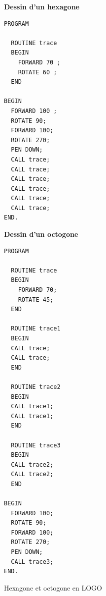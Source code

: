 \begin{table}[t]
  \centering
  \small


\begin{multicols}{2}

\textbf{Dessin d'un hexagone}

\begin{lstlisting}
PROGRAM

  ROUTINE trace
  BEGIN
    FORWARD 70 ;
    ROTATE 60 ;
  END

BEGIN
  FORWARD 100 ;
  ROTATE 90;
  FORWARD 100;
  ROTATE 270;
  PEN DOWN;
  CALL trace;
  CALL trace;
  CALL trace;
  CALL trace;
  CALL trace;
  CALL trace;
END.
\end{lstlisting}


\columnbreak

\textbf{Dessin d'un octogone}

\begin{lstlisting}
PROGRAM

  ROUTINE trace
  BEGIN
    FORWARD 70;
    ROTATE 45;
  END

  ROUTINE trace1
  BEGIN
  CALL trace;
  CALL trace;
  END

  ROUTINE trace2
  BEGIN
  CALL trace1;
  CALL trace1;
  END

  ROUTINE trace3
  BEGIN
  CALL trace2;
  CALL trace2;
  END

BEGIN
  FORWARD 100;
  ROTATE 90;
  FORWARD 100;
  ROTATE 270;
  PEN DOWN;
  CALL trace3;
END.
\end{lstlisting}

\end{multicols}

  \caption{Hexagone et octogone en LOGO}
  \ligne
\end{table}





